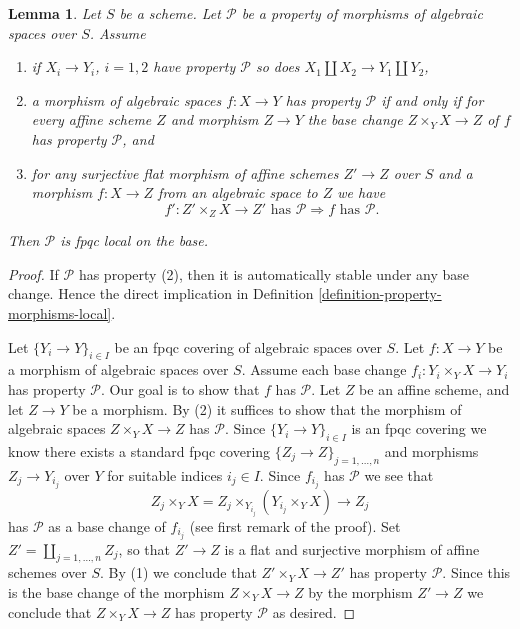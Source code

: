 \documentclass{stacks-project}
\theoremstyle{plain}
\newtheorem{lemma}[subsection]{Lemma}
\theoremstyle{definition}
\theoremstyle{remark}
\numberwithin{equation}{subsection}
\begin{document}
\begin{lemma}
\label{lemma-descending-properties-morphisms}
Let $S$ be a scheme. Let $\mathcal{P}$ be a property of morphisms of
algebraic spaces over $S$. Assume
\begin{enumerate}
\item if $X_i \to Y_i$, $i = 1, 2$ have property $\mathcal{P}$ so
does $X_1 \amalg X_2 \to Y_1 \amalg Y_2$,
\item a morphism of algebraic spaces $f : X \to Y$ has property
$\mathcal{P}$ if and only if for every affine scheme $Z$ and
morphism $Z \to Y$ the base change $Z \times_Y X \to Z$ of $f$
has property $\mathcal{P}$, and
\item for any surjective flat morphism of affine schemes
$Z' \to Z$ over $S$ and a morphism $f : X \to Z$ from an algebraic space
to $Z$ we have
$$
f' : Z' \times_Z X \to Z'\text{ has }\mathcal{P}
\Rightarrow
f\text{ has }\mathcal{P}.
$$
\end{enumerate}
Then $\mathcal{P}$ is fpqc local on the base.
\end{lemma}

\begin{proof}
If $\mathcal{P}$ has property (2), then it is automatically
stable under any base change. Hence the direct implication in
Definition \ref{definition-property-morphisms-local}.

\medskip\noindent
Let $\{Y_i \to Y\}_{i \in I}$ be an fpqc covering of algebraic spaces over $S$.
Let $f : X \to Y$ be a morphism of algebraic spaces over $S$.
Assume each base change $f_i : Y_i \times_Y X \to Y_i$ has property
$\mathcal{P}$. Our goal is to show that $f$ has $\mathcal{P}$.
Let $Z$ be an affine scheme, and let $Z \to Y$ be a morphism.
By (2) it suffices to show that the morphism of algebraic spaces
$Z \times_Y X \to Z$ has $\mathcal{P}$.
Since $\{Y_i \to Y\}_{i \in I}$ is an fpqc covering we know there
exists a standard fpqc covering $\{Z_j \to Z\}_{j = 1, \ldots , n}$
and morphisms $Z_j \to Y_{i_j}$ over $Y$ for suitable indices $i_j \in I$.
Since $f_{i_j}$ has $\mathcal{P}$ we see that
$$
Z_j \times_Y X
=
Z_j \times_{Y_{i_j}} (Y_{i_j} \times_Y X)
\longrightarrow
Z_j
$$
has $\mathcal{P}$ as a base change of $f_{i_j}$ (see first remark of the
proof). Set $Z' = \coprod_{j = 1, \ldots, n} Z_j$, so that $Z' \to Z$ is
a flat and surjective morphism of affine schemes over $S$. By (1)
we conclude that $Z' \times_Y X \to Z'$ has property $\mathcal{P}$.
Since this is the base change of the morphism $Z \times_Y X \to Z$
by the morphism $Z' \to Z$ we conclude that
$Z \times_Y X \to Z$ has property $\mathcal{P}$ as desired.
\end{proof}
\end{document}

